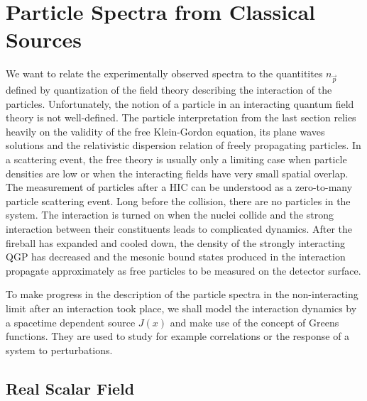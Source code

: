 \section{Particle Spectra from Classical Sources}

We want to relate the experimentally observed spectra to the quantitites $n_{\vec{p}}$ defined by quantization of the field theory describing the interaction of the particles. Unfortunately, the notion of a particle in an interacting quantum field theory is not well-defined. The particle interpretation from the last section relies heavily on the validity of the free Klein-Gordon equation, its plane waves solutions and the relativistic dispersion relation of freely propagating particles. In a scattering event, the free theory is usually only a limiting case when particle densities are low or when the interacting fields have very small spatial overlap. The measurement of particles after a HIC can be understood as a zero-to-many particle scattering event. Long before the collision, there are no particles in the system. The interaction is turned on when the nuclei collide and the strong interaction between their constituents leads to complicated dynamics. After the fireball has expanded and cooled down, the density of the strongly interacting QGP has decreased and the mesonic bound states produced in the interaction propagate approximately as free particles to be measured on the detector surface.

To make progress in the description of the particle spectra in the non-interacting limit after an interaction took place, we shall model the interaction dynamics by a spacetime dependent source $J(x)$ and make use of the concept of Greens functions. They are used to study for example correlations or the response of a system to perturbations.

\subsection{Real Scalar Field}

